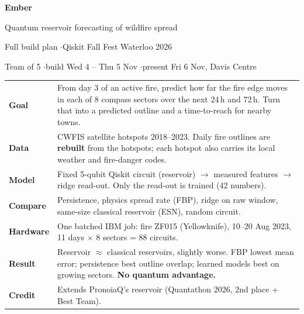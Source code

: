 \documentclass[11pt,a4paper]{article}
\begin{document}
\begin{center}
{\LARGE\bfseries Ember}\par\smallskip
{\Large Quantum reservoir forecasting of wildfire spread}\par\medskip
{\normalsize Full build plan \quad$\cdot$\quad Qiskit Fall Fest Waterloo 2026}\par
{\small Team of 5 \quad$\cdot$\quad build Wed 4 -- Thu 5 Nov \quad$\cdot$\quad present Fri 6 Nov, Davis Centre}\par
\end{center}

\begin{glance}
\begin{tabularx}{\linewidth}{@{}l Y@{}}
\textbf{Goal} & From day 3 of an active fire, predict how far the fire edge moves in each of 8 compass sectors over the
next 24\,h and 72\,h. Turn that into a predicted outline and a time-to-reach for nearby towns.\\
\textbf{Data} & CWFIS satellite hotspots 2018--2023. Daily fire outlines are \textbf{rebuilt} from the hotspots;
each hotspot also carries its local weather and fire-danger codes.\\
\textbf{Model} & Fixed 5-qubit Qiskit circuit (reservoir) $\to$ measured features $\to$ ridge read-out. Only the
read-out is trained (42 numbers).\\
\textbf{Compare} & Persistence, physics spread rate (FBP), ridge on raw window, same-size classical reservoir (ESN),
random circuit.\\
\textbf{Hardware} & One batched IBM job: fire ZF015 (Yellowknife), 10--20 Aug 2023, 11 days $\times$ 8 sectors = 88
circuits.\\
\textbf{Result} & Reservoir $\approx$ classical reservoirs, slightly worse. FBP lowest mean error; persistence best outline overlap; learned models best on growing sectors. \textbf{No quantum advantage.}\\
\textbf{Credit} & Extends PronoiaQ's reservoir (Quantathon 2026, 2nd place + Best Team).\\
\end{tabularx}
\end{glance}
\end{document}
